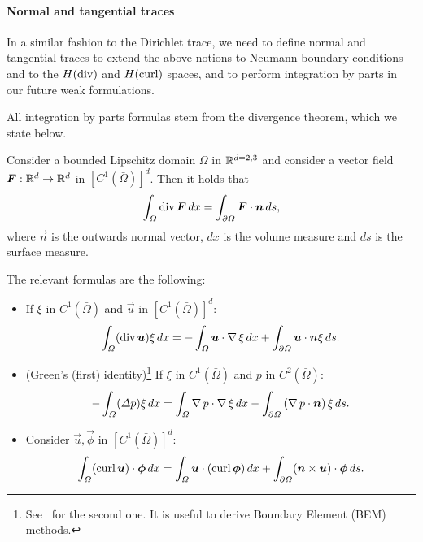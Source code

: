 \paragraph{Normal and tangential traces}
In a similar fashion to the Dirichlet trace, we need to define normal and tangential traces to extend the above notions to Neumann boundary conditions and to the $H(\operatorname{\text{div}})$ and $H(\operatorname{\text{curl}})$ spaces, and to perform integration by parts in our future weak formulations.

All integration by parts formulas stem from the divergence theorem, which we state below.
\begin{theorem}\label{thm:divergence}
    Consider a bounded Lipschitz domain $\Omega$ in $\mathbb{R}^{d=2,3}$ and consider a vector field $\vec F:\R^d \to \R^d$ in $[C^1(\bar\Omega)]^d$. Then it holds that
    \begin{equation*}
        \int_\Omega \dive \vec F\,dx = \int_{\partial\Omega}\vec F\cdot \vec n\,ds,
    \end{equation*}
    where $\vec n$ is the outwards normal vector, $dx$ is the volume measure and $ds$ is the surface measure.
\end{theorem}
The relevant formulas are the following: 
\begin{itemize}
    \item If $\xi$ in $C^1(\bar\Omega)$ and $\vec u$ in $[C^1(\bar\Omega)]^d$:
    \begin{equation}
        \int_\Omega (\dive \vec u) \xi\,dx = -\int_\Omega\vec u\cdot \grad \xi\,dx + \int_{\partial\Omega} \vec u \cdot \vec n \xi\,ds.
    \end{equation}
    \item (Green's (first) identity)\footnote{See~\cite{monk2003finite} for the second one. It is useful to derive Boundary Element (BEM) methods.} If $\xi$ in $C^1(\bar\Omega)$ and $p$ in $C^2(\bar\Omega)$:
    \begin{equation}
        -\int_\Omega (\Delta p) \xi\,dx = \int_\Omega\grad p\cdot \grad \xi\,dx - \int_{\partial\Omega}\left(\grad p\cdot \vec n\right)\xi\,ds.
    \end{equation}
    \item Consider $\vec u,\vec \phi$ in $[C^1(\bar\Omega)]^d$: 
    \begin{equation}
        \int_\Omega (\curl \vec u) \cdot \vec\phi\,dx = \int_\Omega \vec u \cdot (\curl \vec \phi)\,dx  + \int_{\partial\Omega}(\vec n\times \vec u)\cdot \vec\phi\,ds.
    \end{equation}
\end{itemize}

